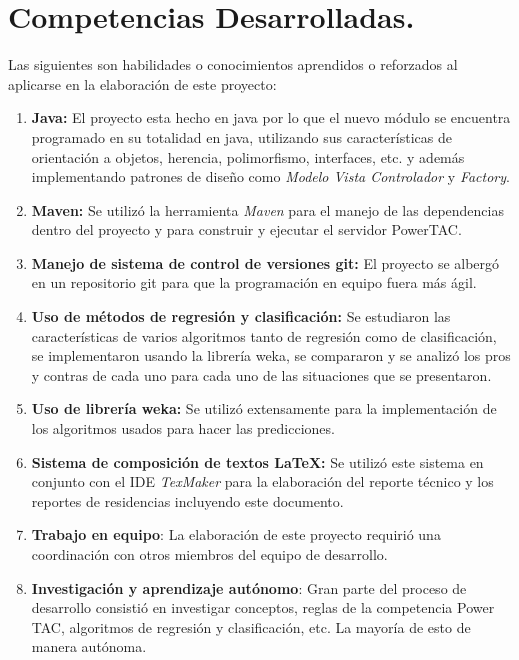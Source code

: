 \section{Competencias Desarrolladas.}

Las siguientes son habilidades o conocimientos aprendidos o reforzados al aplicarse en la elaboración de este proyecto:
\begin{enumerate}
	\item \textbf{Java:} El proyecto esta hecho en java por lo que el nuevo módulo se encuentra programado en su totalidad en java, utilizando sus características de orientación a objetos,  herencia, polimorfismo, interfaces, etc. y además implementando patrones de diseño como \textit{Modelo Vista Controlador} y \textit{Factory}.
	
	\item \textbf{Maven:} Se utilizó la herramienta \textit{Maven} para el manejo de las dependencias dentro del proyecto y para construir y ejecutar el servidor PowerTAC.

	\item \textbf{Manejo de sistema de control de versiones git:} El proyecto se albergó en un repositorio git para que la programación en equipo fuera más ágil.
	
	\item \textbf{Uso de métodos de regresión y clasificación:} Se estudiaron las características de varios algoritmos tanto de regresión como de clasificación, se implementaron usando la librería weka, se compararon y se analizó los pros y contras de cada uno para cada uno de las situaciones que se presentaron.

	\item \textbf{Uso de librería weka:} Se utilizó extensamente para la implementación de los algoritmos usados para hacer las predicciones.

	\item \textbf{Sistema de composición de textos \LaTeX{}:} Se utilizó este sistema en conjunto con el IDE \textit{TexMaker} para la elaboración del reporte técnico y los reportes de residencias incluyendo este documento.
	
	\item \textbf{Trabajo en equipo}: La elaboración de este proyecto requirió una coordinación con otros miembros del equipo de desarrollo.
	
	\item \textbf{Investigación y aprendizaje autónomo}: Gran parte del proceso de desarrollo consistió en investigar conceptos, reglas de la competencia Power TAC, algoritmos de regresión y clasificación, etc. La mayoría de esto de manera autónoma.
	

\end{enumerate}
